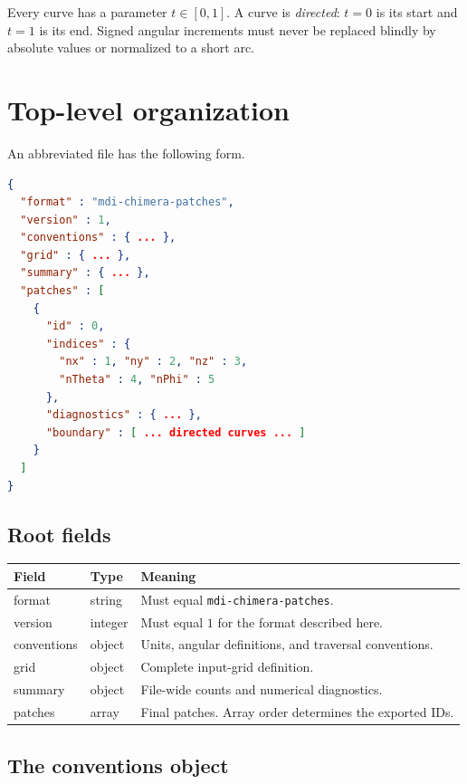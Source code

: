 \documentclass[11pt]{article}
\newcommand{\field}[1]{\texttt{#1}}
\begin{document}
Every curve has a parameter $t\in[0,1]$.  A curve is \emph{directed}: $t=0$
is its start and $t=1$ is its end.  Signed angular increments must never be
replaced blindly by absolute values or normalized to a short arc.

\section{Top-level organization}

An abbreviated file has the following form.

\begin{lstlisting}[language=json,caption={Abbreviated version-1 document}]
{
  "format" : "mdi-chimera-patches",
  "version" : 1,
  "conventions" : { ... },
  "grid" : { ... },
  "summary" : { ... },
  "patches" : [
    {
      "id" : 0,
      "indices" : {
        "nx" : 1, "ny" : 2, "nz" : 3,
        "nTheta" : 4, "nPhi" : 5
      },
      "diagnostics" : { ... },
      "boundary" : [ ... directed curves ... ]
    }
  ]
}
\end{lstlisting}

\subsection{Root fields}

\begin{longtable}{>{\ttfamily}p{}p{}p{}}
\toprule
\normalfont Field & Type & Meaning \\
\midrule
\endhead
format & string & Must equal \field{mdi-chimera-patches}. \\
version & integer & Must equal $1$ for the format described here. \\
conventions & object & Units, angular definitions, and traversal conventions. \\
grid & object & Complete input-grid definition. \\
summary & object & File-wide counts and numerical diagnostics. \\
patches & array & Final patches.  Array order determines the exported IDs. \\
\bottomrule
\end{longtable}

\subsection{The conventions object}
\end{document}
